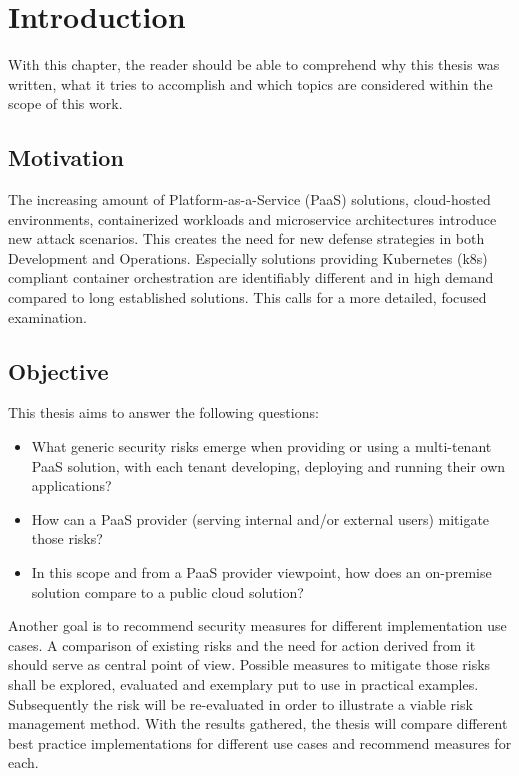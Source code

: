 \chapter{Introduction}
With this chapter, the reader should be able to comprehend why this thesis was written, 
what it tries to accomplish and which topics are considered within the scope of this work.

\section{Motivation}

The increasing amount of Platform-as-a-Service (PaaS) solutions, cloud-hosted environments, containerized workloads and microservice architectures introduce new attack scenarios. 
This creates the need for new defense strategies in both Development and Operations. 
Especially solutions providing Kubernetes (k8s) compliant container orchestration are identifiably different and in high demand compared to long established solutions. 
This calls for a more detailed, focused examination. 

\section{Objective} \label{goal}

This thesis aims to answer the following questions:

\begin{itemize}

\item What generic security risks emerge when providing or using a multi-tenant PaaS solution,
with each tenant developing, deploying and running their own applications? 

\item How can a PaaS provider (serving internal and/or external users) mitigate those risks? 

\item  In this scope and from a PaaS provider viewpoint, how does an on-premise solution compare
to a public cloud solution? 

\end{itemize}

Another goal is to recommend security measures for different implementation use cases.
A comparison of existing risks and the need for action derived from it should serve as central point of view. 
Possible measures to mitigate those risks shall be explored, evaluated and exemplary put to use in practical examples.
Subsequently the risk will be re-evaluated in order to illustrate a viable risk management method.
With the results gathered, the thesis will compare different best practice implementations for different use cases and recommend measures for each.

